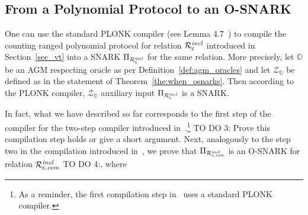 \subsection{From a Polynomial Protocol to an O-SNARK}
\label{sec:interesting}
\noindent One can use the standard PLONK compiler (see Lemma 4.7~\cite{plonk}) to compile the 
counting ranged polynomial protocol for relation $\mathcal{R}^{\mathit{incl}}_{\mathsf{c}}$ introduced in Section~\ref{sec_vt} 
into a SNARK $\Pi_{\mathcal{R}^{\mathit{incl}}_{\mathsf{c}}}$ for the same relation. More precisely, let $\mathbb{O}$ be an 
AGM respecting oracle as per Definition~\ref{def:agm_oracles} and let $\mathcal{Z}_{\mathbb{O}}$ be defined as in the statement of Theorem~\ref{the:when_osnarks}. 
Then according to the PLONK compiler, $\mathcal{Z}_{\mathbb{O}}$ auxiliary input $\Pi_{\mathcal{R}^{\mathit{incl}}_{\mathsf{c}}}$ is a SNARK.

\noindent In fact, what we have described so far corresponds to the first step of the compiler for the two-step compiler 
introduced in~\cite{LC_paper}.\footnote{As a reminder, the first compilation step in~\cite{LC_paper} uses a standard PLONK compiler.}
{\color{red} TO DO 3: Prove this compilation step holds or give a short argument.} 
Next, analogously to the step two in the compilation introduced in~\cite{LC_paper}, we prove that $\Pi_{\mathcal{R}^{\mathit{incl}}_{\mathsf{c},\mathit{com}}}$ is an O-SNARK for relation 
$\mathcal{R}^{\mathit{incl}}_{\mathsf{c},\mathit{com}}$ {\color{red} TO DO 4}:, where 




